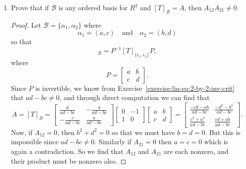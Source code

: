 \begin{enumerate}
\item Prove that if $\mathcal{B}$ is any ordered basis for $R^2$ and
  $[T]_{\mathcal{B}} = A$, then $A_{12}A_{21}\neq0$.
  \begin{proof}
    Let $\mathcal{B} = \{\alpha_1,\alpha_2\}$ where
    \begin{equation*}
      \alpha_1 = (a,c) \quad\text{and}\quad
      \alpha_2 = (b,d)
    \end{equation*}
    so that
    \begin{equation*}
      [T]_{\mathcal{B}}
      = P^{-1}[T]_{\{\epsilon_1,\epsilon_2\}}P,
    \end{equation*}
    where
    \begin{equation*}
      P =
      \begin{bmatrix}
        a & b \\
        c & d
      \end{bmatrix}.
    \end{equation*}
    Since $P$ is invertible, we know from
    Exercise~\ref{exercise:lin-eq:2-by-2-inv-crit} that
    $ad - bc\neq0$, and through direct computation we can find that
    \begin{equation*}
      A = [T]_{\mathcal{B}} =
      \begin{bmatrix}
        \frac{d}{ad - bc} & -\frac{b}{ad - bc} \\[3pt]
        -\frac{c}{ad - bc} & \frac{a}{ad - bc}
      \end{bmatrix}
      \begin{bmatrix}
        0 & -1 \\
        1 & 0
      \end{bmatrix}
      \begin{bmatrix}
        a & b \\
        c & d
      \end{bmatrix}
      =
      \begin{bmatrix}
        \frac{-cd - ab}{ad - bc} & \frac{-d^2 - b^2}{ad - bc} \\[3pt]
        \frac{c^2 + a^2}{ad - bc} & \frac{cd + ab}{ad - bc}
      \end{bmatrix}.
    \end{equation*}
    Now, if $A_{12} = 0$, then $b^2 + d^2 = 0$ so that we must have
    $b = d = 0$. But this is impossible since $ad -
    bc\neq0$. Similarly if $A_{21} = 0$ then $a = c = 0$ which is
    again a contradiction. So we find that $A_{12}$ and $A_{21}$ are
    each nonzero, and their product must be nonzero also.
  \end{proof}
\end{enumerate}

